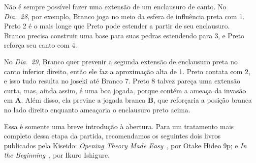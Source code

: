 Não é sempre possível fazer uma extensão de um enclausuro de canto. No \emph{Dia.\@~28}, por exemplo, Branco joga no meio da esfera de influência preta com 1. Preto 2 é o mais longe que Preto pode estender a partir de seu enclausuro. Branco precisa construir uma base para suas pedras estendendo para 3, e Preto reforça seu canto com 4.

No \emph{Dia.\@~29}, Branco quer prevenir a segunda extensão de enclausuro preta no canto inferior direito, então ele faz a aproximação alta de 1. Preto contata com 2, e isso tudo resulta no joseki até Branco 7. Preto 8 talvez pareça uma extensão curta, mas, ainda assim, é uma boa jogada, porque contém a ameaça da invasão em \textbf{A}. Além disso, ela previne a jogada branca \textbf{B}, que reforçaria a posição branca no lado direito enquanto ameaçaria o enclausuro preto acima.

Essa é somente uma breve introdução à abertura. Para um tratamento mais completo dessa etapa da partida, recomendamos os seguintes dois livros publicados pela Kiseido: \emph{Opening Theory Made Easy}~\cite{otake_opening_theory_made_easy}, por Otake Hideo 9p; e \emph{In the Beginning}~\cite{ikure_in_the_beginning}, por Ikuro Ishigure.